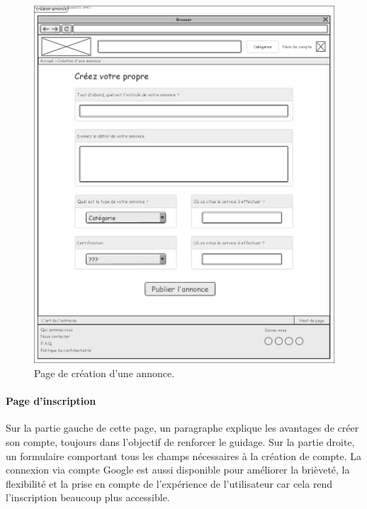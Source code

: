 \documentclass[a4paper,11pt]{article}
\begin{document}
\begin{figure}[H]
  \includegraphics[width=\linewidth]{../Conception/maquette/maquette-creation-annonce.png}
  \caption{Page de création d'une annonce.}
  \label{fig:maquette-creation-annonce}
\end{figure}
\newpage

\paragraph{Page d'inscription}

Sur la partie gauche de cette page, un paragraphe explique les avantages de créer son compte,
toujours dans l'objectif de renforcer le guidage. Sur la partie droite, un formulaire comportant
tous les champs nécessaires à la création de compte. La connexion via compte Google est aussi
disponible pour améliorer la brièveté, la flexibilité et la prise en compte de l'expérience de
l'utilisateur car cela rend l'inscription beaucoup plus accessible.
\end{document}
